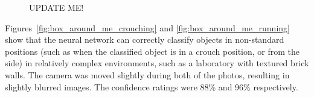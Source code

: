 \begin{figure}[h!]%
    \centering
	\quad
    \caption{UPDATE ME!}%
\end{figure}

Figures~\ref{fig:box_around_me_crouching} and \ref{fig:box_around_me_running} show that the neural network can correctly classify objects in non-standard positions (such as when the classified object is in a crouch position, or from the side) in relatively complex environments, such as a laboratory with textured brick walls. The camera was moved slightly during both of the photos, resulting in slightly blurred images. The confidence ratings were 88\% and 96\% respectively.


